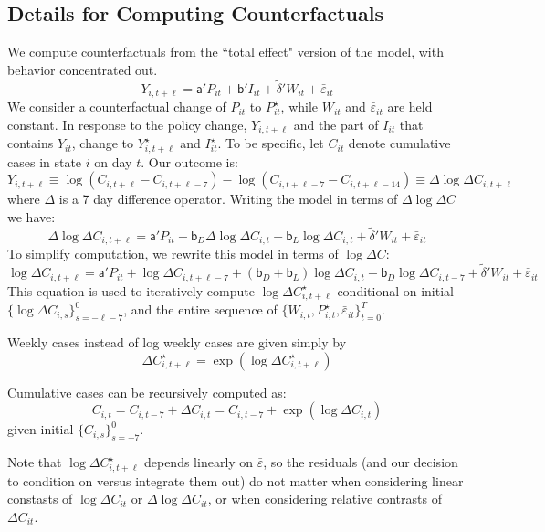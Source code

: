 \documentclass[11pt,reqno,letter]{amsart}
\theoremstyle{definition}
\begin{document}
\subsection{Details for Computing Counterfactuals \label{app:counterfactuals}}

We compute counterfactuals from the ``total effect" version of the
model, with behavior concentrated out.
$$
Y_{i,t+\ell}
= \mathsf{a}'
P_{it} + \mathsf{b}' I_{it} +  {\tilde {\delta}}' W_{it}   + {\bar \varepsilon}_{it}
$$
We consider a counterfactual change of $P_{it}$ to $P_{it}^\star$, while
$W_{it}$ and $\bar \varepsilon_{it}$ are held constant. In response to
the policy change, $Y_{i,t+\ell}$ and the part of $I_{it}$ that
contains $Y_{it}$, change to $Y_{i,t+\ell}^\star$ and $I_{it}^\star$. To be
specific, let $C_{it}$ denote cumulative cases in state $i$ on day
$t$. Our outcome is:
$$
Y_{i,t+\ell} \equiv \log
\left(C_{i, t+\ell} - C_{i, t + \ell - 7} \right) - \log
\left(C_{i, t+\ell-7} - C_{i, t + \ell - 14} \right) \equiv \Delta
\log \Delta C_{i,t+\ell}
$$
where $\Delta$ is a 7 day difference operator. Writing the model in
terms of $\Delta \log \Delta C$ we have:
$$
\Delta \log \Delta C_{i,t+\ell} = \mathsf{a}' P_{it} + \mathsf{b}_D
\Delta \log \Delta C_{i,t} + \mathsf{b}_L \log \Delta C_{i,t} +
{\tilde {\delta}}' W_{it}   + {\bar \varepsilon}_{it}
$$
To simplify computation, we rewrite this model in terms of $\log
\Delta C$:
$$
\log \Delta C_{i,t+\ell} = \mathsf{a}' P_{it} + \log \Delta
C_{i,t+\ell-7} + (\mathsf{b}_D + \mathsf{b}_L) \log \Delta C_{i,t} -
\mathsf{b}_D \log \Delta C_{i,t-7} + {\tilde {\delta}}' W_{it}   + {\bar \varepsilon}_{it}
$$
This equation is used to iteratively compute
$\log \Delta C_{i,t+\ell}^\star$
conditional on initial $\{\log \Delta C_{i,s}\}_{s=-\ell-7}^{0}$,
and the entire sequence of $\{W_{i,t}, P_{i,t}^\star, \bar \varepsilon_{it} \}_{t=0}^T$.

Weekly cases instead of log weekly cases are given simply by
$$ \Delta C_{i,t+\ell}^\star = \exp(\log \Delta C_{i,t+\ell}^\star)$$

Cumulative cases can be recursively computed as:
$$
  C_{i,t} = C_{i,t-7} + \Delta C_{i,t} = C_{i,t-7} + \exp(\log \Delta C_{i,t})
$$
given initial $\{C_{i,s}\}_{s=-7}^0$.

Note that $\log \Delta C_{i,t+\ell}^\star$ depends linearly on
$\bar \varepsilon$, so the residuals (and our decision to condition on
versus integrate them out) do not matter when considering linear
constasts of $\log \Delta C_{it}$ or $\Delta \log \Delta C_{it}$, or
when considering relative contrasts of $\Delta C_{it}$.
\end{document}

